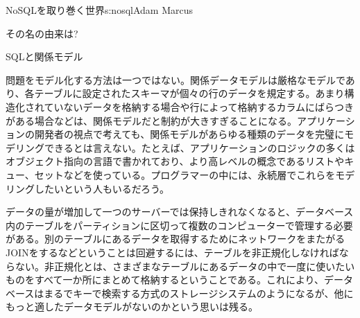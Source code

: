 \begin{aosachapter}{NoSQLを取り巻く世界}{s:nosql}{Adam Marcus}
\begin{aosasect1}{その名の由来は?}
\begin{aosasect2}{SQLと関係モデル}
\begin{aosaitemize}
  \item 問題をモデル化する方法は一つではない。関係データモデルは厳格なモデルであり、各テーブルに設定されたスキーマが個々の行のデータを規定する。あまり構造化されていないデータを格納する場合や行によって格納するカラムにばらつきがある場合などは、関係モデルだと制約が大きすぎることになる。アプリケーションの開発者の視点で考えても、関係モデルがあらゆる種類のデータを完璧にモデリングできるとは言えない。たとえば、アプリケーションのロジックの多くはオブジェクト指向の言語で書かれており、より高レベルの概念であるリストやキュー、セットなどを使っている。プログラマーの中には、永続層でこれらをモデリングしたいという人もいるだろう。

  \item データの量が増加して一つのサーバーでは保持しきれなくなると、データベース内のテーブルをパーティションに区切って複数のコンピューターで管理する必要がある。別のテーブルにあるデータを取得するためにネットワークをまたがるJOINをするなどということは回避するには、テーブルを非正規化しなければならない。非正規化とは、さまざまなテーブルにあるデータの中で一度に使いたいものをすべて一か所にまとめて格納するということである。これにより、データベースはまるでキーで検索する方式のストレージシステムのようになるが、他にもっと適したデータモデルがないのかという思いは残る。


\end{aosaitemize}
\end{aosasect2}
\end{aosasect1}
\end{aosachapter}
